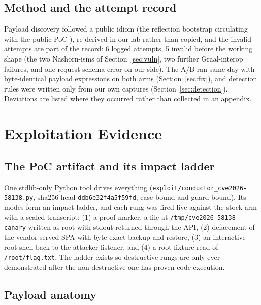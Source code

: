\documentclass[journal]{IEEEtran}
\begin{document}
\subsection{Method and the attempt record}

Payload discovery followed a public idiom (the reflection bootstrap
circulating with the public PoC \cite{publicpoc}), re-derived in our lab
rather than copied, and the invalid attempts are part of the record: 6 logged
attempts, 5 invalid
before the working shape (the two Nashorn-isms of Section~\ref{sec:vuln},
two further Graal-interop failures, and one request-schema error on our
side). The A/B ran same-day with
byte-identical payload expressions on both arms (Section~\ref{sec:fix}), and
detection rules were written only from our own captures
(Section~\ref{sec:detection}). Deviations are listed where they occurred
rather than collected in an appendix.

\section{Exploitation Evidence}
\label{sec:exploit}

\subsection{The PoC artifact and its impact ladder}

One stdlib-only Python tool drives everything
(\texttt{exploit/\allowbreak conductor\_cve2026-58138.py}, sha256 head
\texttt{ddb6e32f4a5f59fd},
case-bound and guard-bound). Its modes form an impact ladder, and each rung
was fired live against the stock arm with a sealed transcript: (1) a proof
marker, a file at \texttt{/tmp/cve2026-58138-}\allowbreak\texttt{canary}
written as root with stdout returned through the API, (2) defacement of the
vendor-served SPA with byte-exact backup and restore, (3) an interactive root
shell back to the attacker listener, and (4) a root fixture read of
\texttt{/root/flag.txt}. The ladder exists so destructive rungs are only ever
demonstrated after the non-destructive one has proven code execution.

\subsection{Payload anatomy}
\end{document}
